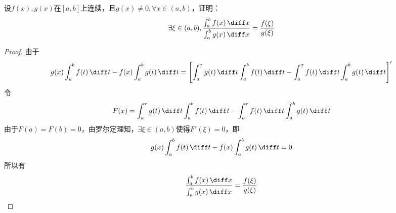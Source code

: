 \begin{example}
    设$f(x),g(x)$在$[a,b]$上连续，且$g(x)\neq 0,\forall x\in(a,b)$，证明：
    \[ \exists \xi\in(a,b) , \frac{\int_a^bf(x)\,\diff x}{\int_a^bg(x)\,\diff x} = \frac{f(\xi)}{g(\xi)} \]
\end{example}
\begin{proof}
    由于
    \[
        g(x)\int_a^bf(t)\,\diff t - f(x)\int_a^bg(t)\,\diff t
        =
        \left[ \int_a^xg(t)\,\diff t \int_a^bf(t)\,\diff t - \int_a^xf(t)\,\diff t \int_a^bg(t)\,\diff t \right]'
    \]
    令
    \[ F(x) = \int_a^xg(t)\,\diff t \int_a^bf(t)\,\diff t - \int_a^xf(t)\,\diff t \int_a^bg(t)\,\diff t \]
    由于$F(a)=F(b)=0$，由罗尔定理知，$\exists\xi\in(a,b)$使得$F'(\xi)=0$，即
    \[ g(x)\int_a^bf(t)\,\diff t - f(x)\int_a^bg(t)\,\diff t = 0 \]
    所以有
    \[ \frac{\int_a^bf(x)\,\diff x}{\int_a^bg(x)\,\diff x} = \frac{f(\xi)}{g(\xi)} \]
\end{proof}

